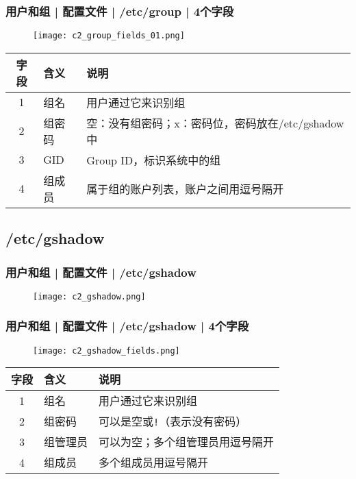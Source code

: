 \begin{frame}
  \frametitle{用户和组 | 配置文件 | /etc/group | \alert{4个字段}}
  \vspace{-0.3cm}
  \begin{figure}
    \centering
    \texttt{[image: c2\_group\_fields\_01.png]}
  \end{figure}
  \pause
  \vspace{-0.5cm}
  \begin{table}
    \centering
    \begin{tabularx}{\textwidth}{clX}
      \hline
      \rowcolor{blue!50}字段 & 含义 & 说明\\
      \hline
      1 & 组名 & 用户通过它来识别组\\
      2 & 组密码 & 空：没有组密码；x：密码位，密码放在/etc/gshadow中\\
      3 & GID & Group ID，标识系统中的组\\
      4 & 组成员 & 属于组的账户列表，账户之间用逗号隔开\\
      \hline
    \end{tabularx}
  \end{table}
\end{frame}

\subsection{/etc/gshadow}
\begin{frame}
  \frametitle{用户和组 | 配置文件 | /etc/gshadow}
  \begin{figure}
    \centering
    \texttt{[image: c2\_gshadow.png]}
  \end{figure}
\end{frame}

\begin{frame}
  \frametitle{用户和组 | 配置文件 | /etc/gshadow | 4个字段}
  \vspace{-0.3cm}
  \begin{figure}
    \centering
    \texttt{[image: c2\_gshadow\_fields.png]}
  \end{figure}
  \pause
  \vspace{-0.5cm}
  \begin{table}
    \centering
    \begin{tabularx}{\textwidth}{clX}
      \hline
      \rowcolor{blue!50}字段 & 含义 & 说明\\
      \hline
      1 & 组名 & 用户通过它来识别组\\
      2 & 组密码 & 可以是空或\verb|!|（表示没有密码）\\
      3 & 组管理员 & 可以为空；多个组管理员用逗号隔开\\
      4 & 组成员 & 多个组成员用逗号隔开\\
      \hline
    \end{tabularx}
  \end{table}
\end{frame}

